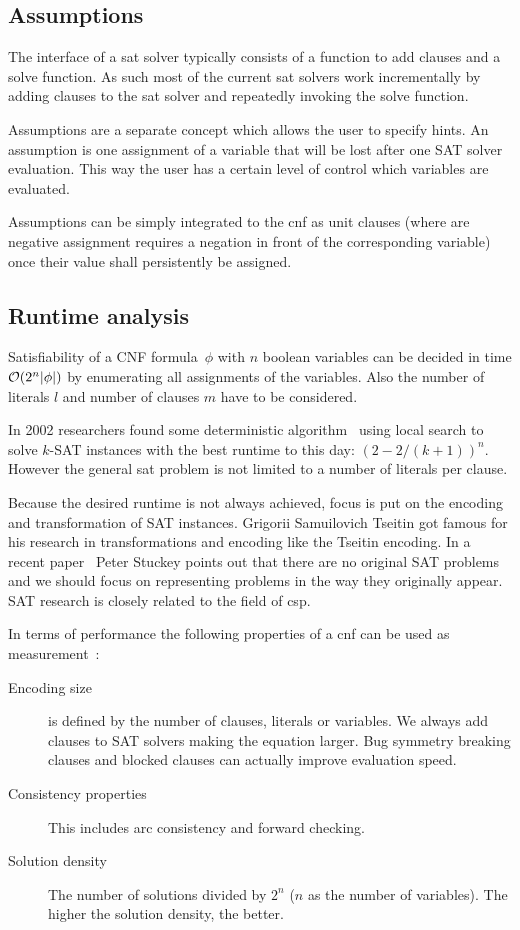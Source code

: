 \subsection{Assumptions}
\label{sec:satsolvers-assumptions}
%
The interface of a \gls{sat} solver typically consists of a function to add clauses and a solve function. As such most of the current \gls{sat} solvers work incrementally by adding clauses to the \gls{sat} solver and repeatedly invoking the solve function.

Assumptions are a separate concept which allows the user to specify hints. An assumption is one assignment of a variable that will be lost after one SAT solver evaluation. This way the user has a certain level of control which variables are evaluated.

Assumptions can be simply integrated to the \gls{cnf} as unit clauses (where are negative assignment requires a negation in front of the corresponding variable) once their value shall persistently be assigned.

\subsection{Runtime analysis}
\label{sec:satsolvers-runtime}
%
Satisfiability of a CNF formula~$\phi$ with $n$ boolean variables can be decided in time $\mathcal{O}(2^n \lvert \phi\rvert)$ by enumerating all assignments of the variables. Also the number of literals $l$ and number of clauses $m$ have to be considered.

In 2002 researchers found some deterministic algorithm~\cite{Sat07} using local search to solve $k$-SAT instances with the best runtime to this day: $(2 - 2/(k+1))^n$. However the general \gls{sat} problem is not limited to a number of literals per clause.

Because the desired runtime is not always achieved, focus is put on the encoding and transformation of SAT instances. Grigorii Samuilovich Tseitin got famous for his research in transformations and encoding like the Tseitin encoding. In a recent paper~\cite{Sat22} Peter Stuckey points out that there are no original SAT problems and we should focus on representing problems in the way they originally appear. SAT research is closely related to the field of \gls{csp}.

In terms of performance the following properties of a \gls{cnf} can be used as measurement~\cite{Sat20}:
\begin{description}
  \item[Encoding size]
    is defined by the number of clauses, literals or variables.
    We always add clauses to SAT solvers making the equation larger. Bug symmetry breaking clauses and blocked clauses can actually improve evaluation speed.
  \item[Consistency properties]
    This includes arc consistency and forward checking.
  \item[Solution density]
    The number of solutions divided by $2^n$ ($n$ as the number of variables). The higher the solution density, the better.
\end{description}

